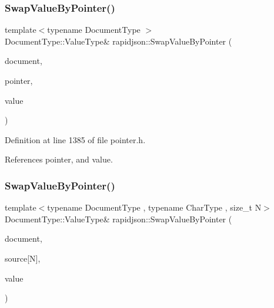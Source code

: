 \subsubsection{\texorpdfstring{SwapValueByPointer()}{SwapValueByPointer()}\hspace{0.1cm}{\footnotesize\ttfamily [3/4]}}
{\footnotesize\ttfamily template$<$typename Document\+Type $>$ \\
Document\+Type\+::\+Value\+Type\& rapidjson\+::\+Swap\+Value\+By\+Pointer (\begin{DoxyParamCaption}\item[{Document\+Type \&}]{document,  }\item[{const \mbox{\hyperlink{classrapidjson_1_1_generic_pointer}{Generic\+Pointer}}$<$ typename Document\+Type\+::\+Value\+Type $>$ \&}]{pointer,  }\item[{typename Document\+Type\+::\+Value\+Type \&}]{value }\end{DoxyParamCaption})}



Definition at line 1385 of file pointer.\+h.


\begin{DoxyCode}{0}

\end{DoxyCode}


References pointer, and value.

\mbox{\label{namespacerapidjson_adb20ad4981c389a8007b5e58b901c558}} 
\subsubsection{\texorpdfstring{SwapValueByPointer()}{SwapValueByPointer()}\hspace{0.1cm}{\footnotesize\ttfamily [4/4]}}
{\footnotesize\ttfamily template$<$typename Document\+Type , typename Char\+Type , size\+\_\+t N$>$ \\
Document\+Type\+::\+Value\+Type\& rapidjson\+::\+Swap\+Value\+By\+Pointer (\begin{DoxyParamCaption}\item[{Document\+Type \&}]{document,  }\item[{const Char\+Type(\&)}]{source\mbox{[}\+N\mbox{]},  }\item[{typename Document\+Type\+::\+Value\+Type \&}]{value }\end{DoxyParamCaption})}




